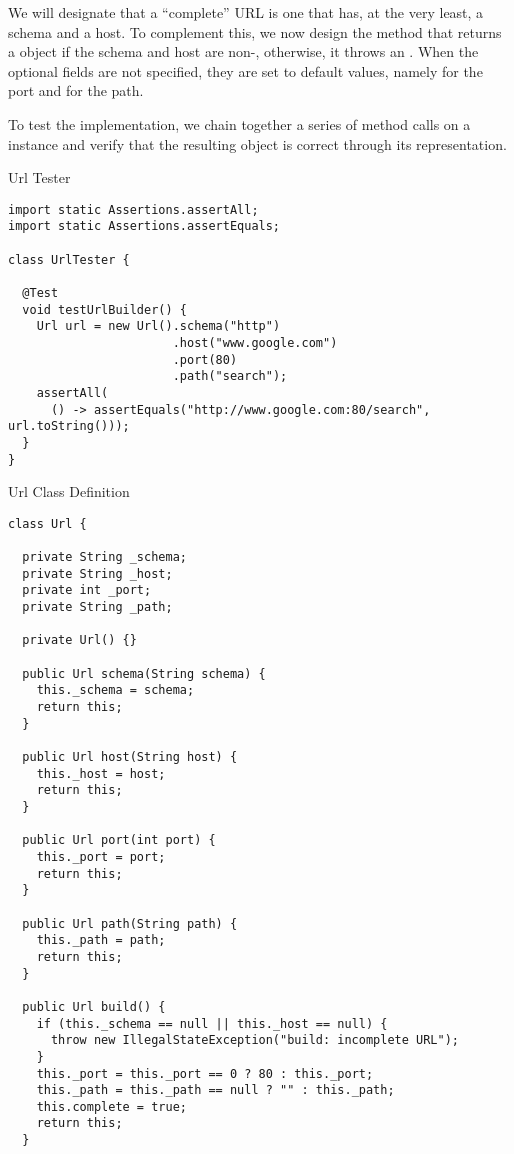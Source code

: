 \begin{verbnobox}[\footnotesize]
We will designate that a ``complete'' URL is one that has, at the very least, a schema and a host. To complement this, we now design the  method that returns a  object if the schema and host are non-, otherwise, it throws an . When the optional fields are not specified, they are set to default values, namely  for the port and  for the path.

To test the implementation, we chain together a series of method calls on a  instance and verify that the resulting  object is correct through its  representation.

\begin{cl}{Url Tester}
\begin{lstlisting}[language=MyJava]
import static Assertions.assertAll;
import static Assertions.assertEquals;

class UrlTester {

  @Test
  void testUrlBuilder() {
    Url url = new Url().schema("http")
                       .host("www.google.com")
                       .port(80)
                       .path("search");
    assertAll(
      () -> assertEquals("http://www.google.com:80/search", url.toString()));
  }
}
\end{lstlisting}
\end{cl}

\begin{cl}{Url Class Definition}
\begin{lstlisting}[language=MyJava]
class Url {

  private String _schema;
  private String _host;
  private int _port;
  private String _path;
  
  private Url() {}

  public Url schema(String schema) {
    this._schema = schema;
    return this;
  }

  public Url host(String host) {
    this._host = host;
    return this;
  }

  public Url port(int port) {
    this._port = port;
    return this;
  }

  public Url path(String path) {
    this._path = path;
    return this;
  }

  public Url build() {
    if (this._schema == null || this._host == null) {
      throw new IllegalStateException("build: incomplete URL");
    }
    this._port = this._port == 0 ? 80 : this._port;
    this._path = this._path == null ? "" : this._path;
    this.complete = true;
    return this;
  }


\end{lstlisting}
\end{cl}
\end{verbnobox}

